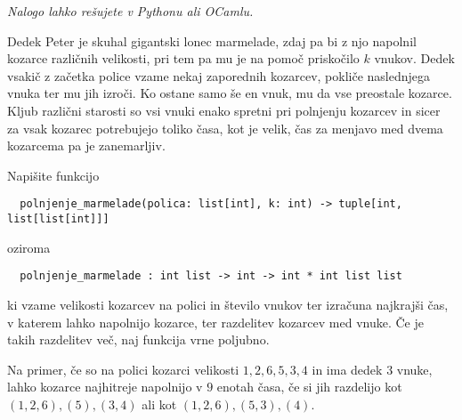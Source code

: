 \documentclass[arhiv]{../izpit}
\begin{document}

\naloga

\emph{Nalogo lahko rešujete v Pythonu ali OCamlu.}

Dedek Peter je skuhal gigantski lonec marmelade, zdaj pa bi z njo napolnil kozarce različnih velikosti, pri tem pa mu je na pomoč priskočilo $k$ vnukov. Dedek vsakič z začetka police vzame nekaj zaporednih kozarcev, pokliče naslednjega vnuka ter mu jih izroči. Ko ostane samo še en vnuk, mu da vse preostale kozarce. Kljub različni starosti so vsi vnuki enako spretni pri polnjenju kozarcev in sicer za vsak kozarec potrebujejo toliko časa, kot je velik, čas za menjavo med dvema kozarcema pa je zanemarljiv.

Napišite funkcijo
\begin{verbatim}
  polnjenje_marmelade(polica: list[int], k: int) -> tuple[int, list[list[int]]]
\end{verbatim}
oziroma
\begin{verbatim}
  polnjenje_marmelade : int list -> int -> int * int list list
\end{verbatim}
ki vzame velikosti kozarcev na polici in število vnukov ter izračuna najkrajši čas, v katerem lahko napolnijo kozarce, ter razdelitev kozarcev med vnuke. Če je takih razdelitev več, naj funkcija vrne poljubno.

Na primer, če so na polici kozarci velikosti $1, 2, 6, 5, 3, 4$ in ima dedek $3$ vnuke, lahko kozarce najhitreje napolnijo v $9$ enotah časa, če si jih razdelijo kot $(1, 2, 6), (5), (3, 4)$ ali kot $(1, 2, 6), (5, 3), (4)$.
\end{document}
